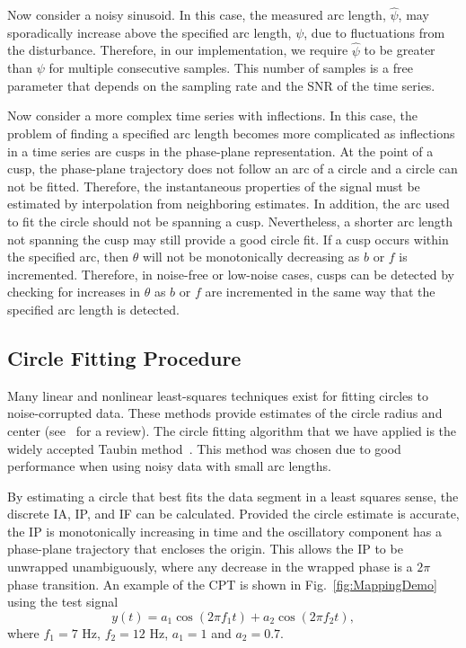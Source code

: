 \documentclass[11pt,draftcls,onecolumn]{IEEEtran}
\begin{document}
Now consider a noisy sinusoid. In this case, the measured arc length, $\hat\psi$, may sporadically increase above the specified arc length, $\psi$, due to fluctuations from the disturbance. Therefore, in our implementation, we require $\hat\psi$ to be greater than $\psi$ for multiple consecutive samples. This number of samples is a free parameter that depends on the sampling rate and the SNR of the time series.

Now consider a more complex time series with inflections. In this case, the problem of finding a specified arc length becomes more complicated as inflections in a time series are cusps in the phase-plane representation. At the point of a cusp, the phase-plane trajectory does not follow an arc of a circle and a circle can not be fitted. Therefore, the instantaneous properties of the signal must be estimated by interpolation from neighboring estimates. In addition, the arc used to fit the circle should not be spanning a cusp. Nevertheless, a shorter arc length not spanning the cusp may still provide a good circle fit. If a cusp occurs within the specified arc, then $\theta$ will not be monotonically decreasing as $b$ or $f$ is incremented. Therefore, in noise-free or low-noise cases, cusps can be detected by checking for increases in $\theta$ as $b$ or $f$ are incremented in the same way that the specified arc length is detected. 

\subsection{Circle Fitting Procedure}\label{sect:CircleFittingProcedure}
Many linear and nonlinear least-squares techniques exist for fitting circles to noise-corrupted data. These methods provide estimates of the circle radius and center (see~\cite{Chernov2005} for a review). The circle fitting algorithm that we have applied is the widely accepted Taubin method~\cite{Taubin1991}. This method was chosen due to good performance when using noisy data with small arc lengths.

By estimating a circle that best fits the data segment in a least squares sense, the discrete IA, IP, and IF can be calculated. Provided the circle estimate is accurate, the IP is monotonically increasing in time and the oscillatory component has a phase-plane trajectory that encloses the origin. This allows the IP to be unwrapped unambiguously, where any decrease in the wrapped phase is a $2\pi$ phase transition. An example of the CPT is shown in Fig.~\ref{fig:MappingDemo} using the test signal
\begin{equation}\label{eq:SecondTestSig}
y\left( t \right) = a_1\cos \left(2\pi f_1 t\right) + a_2\cos \left(2\pi f_2 t\right),
\end{equation}
where $f_1 = 7$ Hz, $f_2 = 12$ Hz, $a_1 = 1$ and $a_2=0.7$.
\end{document}
